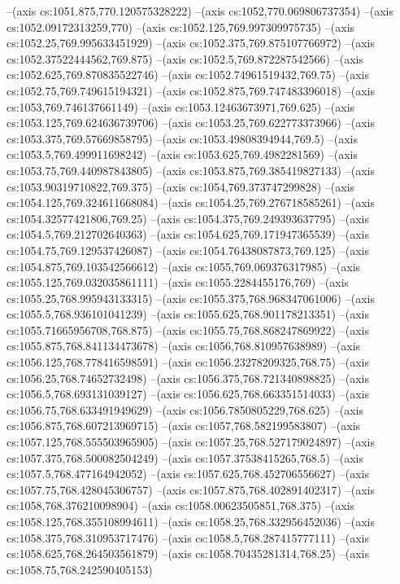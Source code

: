--(axis cs:1051.875,770.120575328222)
--(axis cs:1052,770.069806737354)
--(axis cs:1052.09172313259,770)
--(axis cs:1052.125,769.997309975735)
--(axis cs:1052.25,769.995633451929)
--(axis cs:1052.375,769.875107766972)
--(axis cs:1052.37522444562,769.875)
--(axis cs:1052.5,769.872287542566)
--(axis cs:1052.625,769.870835522746)
--(axis cs:1052.74961519432,769.75)
--(axis cs:1052.75,769.749615194321)
--(axis cs:1052.875,769.747483396018)
--(axis cs:1053,769.746137661149)
--(axis cs:1053.12463673971,769.625)
--(axis cs:1053.125,769.624636739706)
--(axis cs:1053.25,769.622773373966)
--(axis cs:1053.375,769.57669858795)
--(axis cs:1053.49808394944,769.5)
--(axis cs:1053.5,769.499911698242)
--(axis cs:1053.625,769.4982281569)
--(axis cs:1053.75,769.440987843805)
--(axis cs:1053.875,769.385419827133)
--(axis cs:1053.90319710822,769.375)
--(axis cs:1054,769.373747299828)
--(axis cs:1054.125,769.324611668084)
--(axis cs:1054.25,769.276718585261)
--(axis cs:1054.32577421806,769.25)
--(axis cs:1054.375,769.249393637795)
--(axis cs:1054.5,769.212702640363)
--(axis cs:1054.625,769.171947365539)
--(axis cs:1054.75,769.129537426087)
--(axis cs:1054.76438087873,769.125)
--(axis cs:1054.875,769.103542566612)
--(axis cs:1055,769.069376317985)
--(axis cs:1055.125,769.032035861111)
--(axis cs:1055.2284455176,769)
--(axis cs:1055.25,768.995943133315)
--(axis cs:1055.375,768.968347061006)
--(axis cs:1055.5,768.936101041239)
--(axis cs:1055.625,768.901178213351)
--(axis cs:1055.71665956708,768.875)
--(axis cs:1055.75,768.868247869922)
--(axis cs:1055.875,768.841134473678)
--(axis cs:1056,768.810957638989)
--(axis cs:1056.125,768.778416598591)
--(axis cs:1056.23278209325,768.75)
--(axis cs:1056.25,768.74652732498)
--(axis cs:1056.375,768.721340898825)
--(axis cs:1056.5,768.693131039127)
--(axis cs:1056.625,768.663351514033)
--(axis cs:1056.75,768.633491949629)
--(axis cs:1056.7850805229,768.625)
--(axis cs:1056.875,768.607213969715)
--(axis cs:1057,768.582199583807)
--(axis cs:1057.125,768.555503965905)
--(axis cs:1057.25,768.527179024897)
--(axis cs:1057.375,768.500082504249)
--(axis cs:1057.37538415265,768.5)
--(axis cs:1057.5,768.477164942052)
--(axis cs:1057.625,768.452706556627)
--(axis cs:1057.75,768.428045306757)
--(axis cs:1057.875,768.402891402317)
--(axis cs:1058,768.376210098904)
--(axis cs:1058.00623505851,768.375)
--(axis cs:1058.125,768.355108994611)
--(axis cs:1058.25,768.332956452036)
--(axis cs:1058.375,768.310953717476)
--(axis cs:1058.5,768.287415777111)
--(axis cs:1058.625,768.264503561879)
--(axis cs:1058.70435281314,768.25)
--(axis cs:1058.75,768.242590405153)
